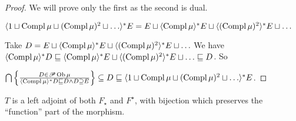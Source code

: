 \begin{proof}
  We will prove only the first as the second is dual.
  
  $\langle 1 \sqcup \operatorname{Compl} \mu \sqcup (\operatorname{Compl} \mu)^2 \sqcup \ldots
  \rangle^{\ast} E = E \sqcup \langle \operatorname{Compl} \mu \rangle^{\ast} E \sqcup
  \langle (\operatorname{Compl} \mu)^2 \rangle^{\ast} E \sqcup \ldots$
  
  Take $D = E \sqcup \langle \operatorname{Compl} \mu \rangle^{\ast} E \sqcup \langle
  (\operatorname{Compl} \mu)^2 \rangle^{\ast} E \sqcup \ldots$ We have $\langle
  \operatorname{Compl} \mu \rangle^{\ast} D \sqsubseteq \langle \operatorname{Compl} \mu
  \rangle^{\ast} E \sqcup \langle (\operatorname{Compl} \mu)^2 \rangle^{\ast} E \sqcup
  \ldots \sqsubseteq D$. So
  
  $\bigcap \left\{ \frac{ D \in \mathscr{P} \operatorname{Ob} \mu }{
  \langle \operatorname{Compl} \mu \rangle^{\ast} D \sqsubseteq D \wedge D \supseteq E
  }\right\} \subseteq D \sqsubseteq \langle 1 \sqcup \operatorname{Compl} \mu \sqcup
  (\operatorname{Compl} \mu)^2 \sqcup \ldots \rangle^{\ast} E$.
\end{proof}

\begin{thm}
  $T$ is a left adjoint of both $F_{\star}$ and $F^{\star}$, with bijection
  which preserves the ``function'' part of the morphism.
\end{thm}

